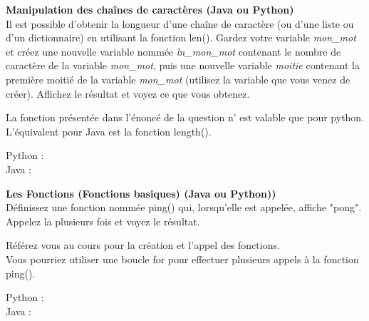\begin{Exercice}[5 minutes] \textbf{Manipulation des chaînes de caractères (Java ou Python)}\\
   Il est possible d'obtenir la longueur d'une chaîne de caractère (ou d'une liste ou d'un dictionnaire) en utilisant la fonction len(). Gardez votre variable \textit{mon\_mot} et créez une nouvelle variable nommée \textit{ln\_mon\_mot} contenant le nombre de caractère de la variable \textit{mon\_mot}, puis une nouvelle variable \textit{moitie} contenant la première moitié de la variable \textit{mon\_mot} (utilisez la variable que vous venez de créer). Affichez le résultat et voyez ce que vous obtenez.   \\
   
    \begin{conseil}
      	La fonction présentée dans l'énoncé de la question n' est valable que pour python. L'équivalent pour Java est la fonction length().
        
    \end{conseil}
    \begin{solution}
    
    Python : \\
    
    
    
    Java : \\
    
    
           
    \end{solution}   
\end{Exercice}

\begin{Exercice}[3 minutes] \textbf{Les Fonctions (Fonctions basiques) (Java ou Python))}\\
  Définissez une fonction nommée ping() qui, lorsqu'elle est appelée, affiche "pong". Appelez la plusieurs fois et voyez le résultat.  \\
   
    \begin{conseil}
		Référez vous au cours pour la création et l'appel des fonctions. \\
      	
      	Vous pourriez utiliser une boucle for pour effectuer plusieurs appels à la fonction ping().
        
    \end{conseil}
    \begin{solution}
    
    Python : \\
    
    
    
    Java : \\
    
    
           
    \end{solution}   
\end{Exercice}

